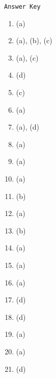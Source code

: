 \begin{center}
\texttt{Answer Key}
\begin{multicols}{5}
\begin{enumerate}
\item (a)
\item (a), (b), (c)
\item (a), (c)
\item (d)
\item (c)
\item (a)
\item (a), (d)
\item (a)
\item (a)
\item (a)
\item (b)
\item (a)
\item (b)
\item (a)
\item (a)
\item (a)
\item (d)
\item (d)
\item (a)
\item (a)
\item (d)
\end{enumerate}
\end{multicols}
\end{center}

